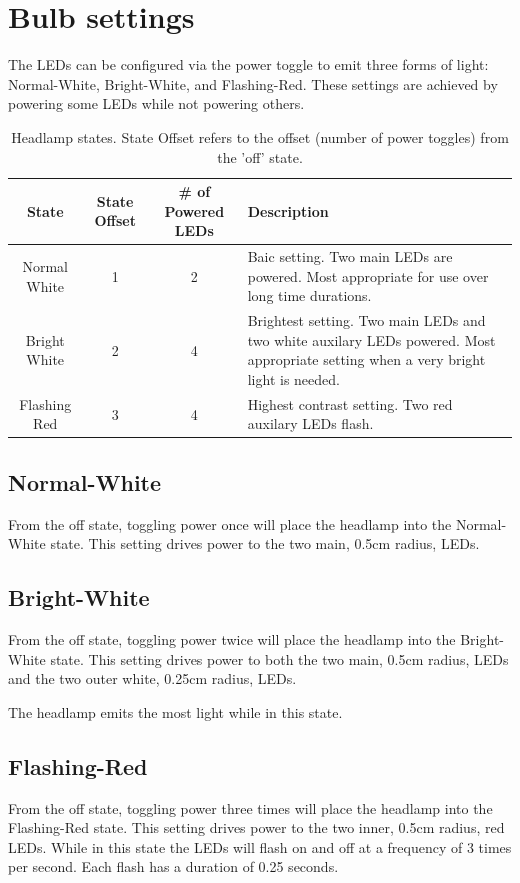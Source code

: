 \documentclass[12pt]{article}
\begin{document}
\section{Bulb settings}
The LEDs can be configured via the power toggle to emit three forms of light: Normal-White,
Bright-White, and Flashing-Red. These settings are achieved by powering some LEDs while not
powering others.

\begin{table}
\begin{tabular}{ | c | c | c | p{5cm} |}
    \hline
    State & State Offset & \# of Powered LEDs & Description \\ \hline
    Normal White & 1 & 2 &  Baic setting. Two main LEDs are powered. Most appropriate for use over
    long time durations.\\ \hline
    Bright White & 2 & 4 &  Brightest setting. Two main LEDs and two white auxilary LEDs powered.
    Most appropriate setting when a very bright light is needed.\\ \hline
    Flashing Red & 3 & 4 &  Highest contrast setting. Two red auxilary LEDs flash.\\ \hline
\end{tabular}
\caption{Headlamp states. State Offset refers to the offset (number of power toggles) from the 'off' state.}
\end{table}

\subsection{Normal-White}
From the off state, toggling power once will place the headlamp into the Normal-White state.  This
setting drives power to the two main, 0.5cm radius, LEDs.

\subsection{Bright-White}
From the off state, toggling power twice will place the headlamp into the Bright-White state.  This
setting drives power to both the two main, 0.5cm radius, LEDs and the two outer white, 0.25cm radius, LEDs.

The headlamp emits the most light while in this state.

\subsection{Flashing-Red}
From the off state, toggling power three times will place the headlamp into the Flashing-Red state.
This setting drives power to the two inner, 0.5cm radius, red LEDs. While in this state the
LEDs will flash on and off at a frequency of 3 times per second. Each flash has a duration of
0.25 seconds.
\end{document}
